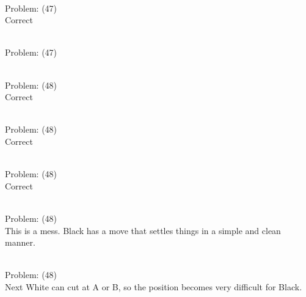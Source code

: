 \documentclass[11pt]{article}
\begin{document}
\begin{minipage}[t]{0.5\textwidth}
  {\centering
  
\\
Problem: (47)\\
Correct\\
  }
\end{minipage}
\begin{minipage}[t]{0.5\textwidth}
  {\centering
  
\\
Problem: (47)\\
  }
\end{minipage}
\begin{minipage}[t]{0.5\textwidth}
  {\centering
  
\\
Problem: (48)\\
Correct\\
  }
\end{minipage}
\begin{minipage}[t]{0.5\textwidth}
  {\centering
  
\\
Problem: (48)\\
Correct\\
  }
\end{minipage}
\begin{minipage}[t]{0.5\textwidth}
  {\centering
  
\\
Problem: (48)\\
Correct\\
  }
\end{minipage}
\begin{minipage}[t]{0.5\textwidth}
  {\centering
  
\\
Problem: (48)\\
This is a mess. Black has a move that settles things in a simple and clean manner.\\
  }
\end{minipage}
\begin{minipage}[t]{0.5\textwidth}
  {\centering
  
\\
Problem: (48)\\
Next White can cut at A or B, so the position becomes very difficult for Black.\\
  }
\end{minipage}
\end{document}
